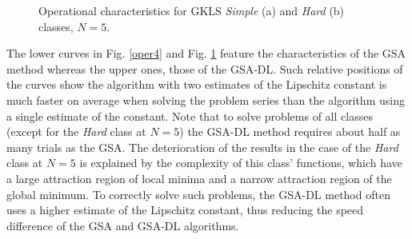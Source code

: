 \documentclass[runningheads]{llncs}
\begin{document}
\begin{figure}
\begin{minipage}{0.5\linewidth}
\end{minipage}
\caption{Operational characteristics for GKLS \textit{Simple} (a) and \textit{Hard} (b) classes, $N=5$.}
\label{oper5}
\end{figure}


The lower curves in Fig. \ref{oper4} and Fig. \ref{oper5} feature the characteristics of the GSA method whereas the upper ones, those of the GSA-DL. Such relative positions of the curves show the algorithm with two estimates of the Lipschitz constant is much faster on average when solving the problem series than the algorithm using a single estimate of the constant.
Note that to solve problems of all classes (except for the \textit{Hard} class at $N=5$) the GSA-DL method requires about half as many trials as the GSA. The deterioration of the results in the case of the \textit{Hard} class at $N=5$ is explained by the complexity of this class' functions, which have a large attraction region of local minima and a narrow attraction region of the global minimum. To correctly solve such problems, the GSA-DL method often uses a higher estimate of the Lipschitz constant, thus reducing the speed difference of the GSA and GSA-DL algorithms.

%




\end{document}
